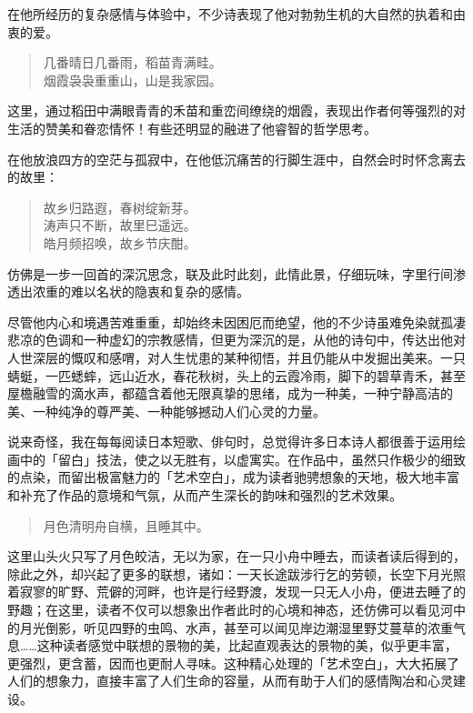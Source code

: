 {    在他所经历的复杂感情与体验中，不少诗表现了他对勃勃生机的大自然的执着和由衷的爱。

    \begin{quote}
        几番晴日几番雨，稻苗青满畦。\\
        烟霞袅袅重重山，山是我家园。
    \end{quote}

    这里，通过稻田中满眼青青的禾苗和重峦间缭绕的烟霞，表现出作者何等强烈的对生活的赞美和眷恋情怀！有些还明显的融进了他睿智的哲学思考。

    在他放浪四方的空茫与孤寂中，在他低沉痛苦的行脚生涯中，自然会时时怀念离去的故里：

    \begin{quote}
        故乡归路遐，春树绽新芽。\\
        涛声只不断，故里巳遥远。\\
        皓月频招唤，故乡节庆酣。
    \end{quote}

    仿佛是一步一回首的深沉思念，联及此时此刻，此情此景，仔细玩味，字里行间渗透出浓重的难以名状的隐衷和复杂的感情。

    尽管他内心和境遇苦难重重，却始终未因困厄而绝望，他的不少诗虽难免染就孤凄悲凉的色调和一种虚幻的宗教感情，但更为深沉的是，从他的诗句中，传达出他对人世深层的慨叹和感喟，对人生忧患的某种彻悟，并且仍能从中发掘出美来。一只蜻蜓，一匹蟋蟀，远山近水，春花秋树，头上的云霞冷雨，脚下的碧草青禾，甚至屋檐融雪的滴水声，都蕴含着他无限真挚的思绪，成为一种美，一种宁静高洁的美、一种纯净的尊严美、一种能够撼动人们心灵的力量。

    说来奇怪，我在每每阅读日本短歌、俳句时，总觉得许多日本诗人都很善于运用绘画中的「留白」技法，使之以无胜有，以虚寓实。在作品中，虽然只作极少的细致的点染，而留出极富魅力的「艺术空白」，成为读者驰骋想象的天地，极大地丰富和补充了作品的意境和气氛，从而产生深长的韵味和强烈的艺术效果。

    \begin{quote}
        月色清明舟自横，且睡其中。
    \end{quote}

    这里山头火只写了月色皎洁，无以为家，在一只小舟中睡去，而读者读后得到的，除此之外，却兴起了更多的联想，诸如：一天长途跋涉行乞的劳顿，长空下月光照着寂寥的旷野、荒僻的河畔，也许是行经野渡，发现一只无人小舟，便进去睡了的野趣；在这里，读者不仅可以想象出作者此时的心境和神态，还仿佛可以看见河中的月光倒影，听见四野的虫鸣、水声，甚至可以闻见岸边潮湿里野艾蔓草的浓重气息……这种读者感觉中联想的景物的美，比起直观表达的景物的美，似乎更丰富，更强烈，更含蓄，因而也更耐人寻味。这种精心处理的「艺术空白」，大大拓展了人们的想象力，直接丰富了人们生命的容量，从而有助于人们的感情陶冶和心灵建设。

}
